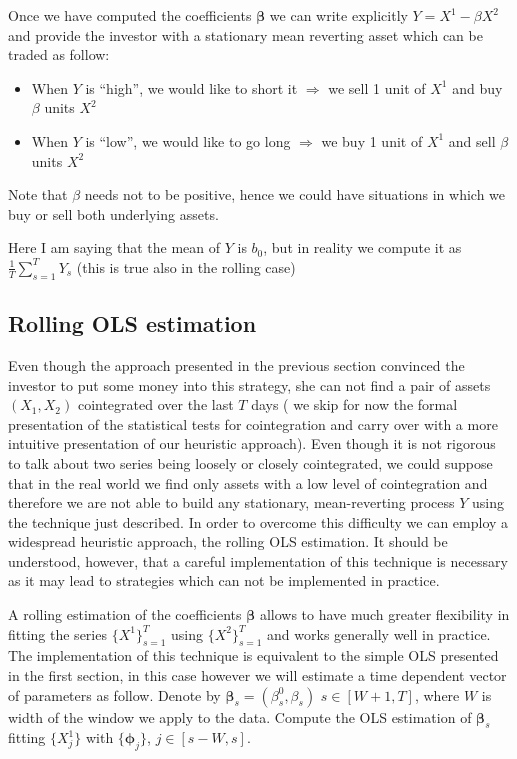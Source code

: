\documentclass[a4paper,11pt]{article}
\theoremstyle{remark}
\theoremstyle{plain}
\newcommand\ab[1]{{\color{blue} #1 }}
\begin{document}
Once we have computed the coefficients $\boldsymbol{\beta}$ we can write explicitly $Y=X^1-\beta X^2$ and provide the investor with a stationary mean reverting asset which can be traded as follow:
\begin{itemize}
\item When $Y$ is ``high'', we would like to short it $\Rightarrow$ we sell 1 unit of $X^1$ and buy $\beta$ units $X^2$
\item When $Y$ is ``low'', we would like to go long $\Rightarrow$ we buy 1 unit of $X^1$ and sell $\beta$ units $X^2$
\end{itemize}
Note that $\beta$ needs not to be positive, hence we could have situations in which we buy or sell both underlying assets.

\ab{Here I am saying that the mean of $Y$ is $b_0$, but in reality we compute it as $\frac{1}{T}\sum_{s=1}^T Y_s$ (this is true also in the rolling case) }

\subsection{Rolling OLS estimation}
Even though the approach presented in the previous section convinced the investor to put some money into this strategy, she can not find a pair of assets $(X_1,X_2)$ cointegrated over the last $T$ days ( we skip for now the formal presentation of the statistical tests for cointegration and carry over with a more intuitive presentation of our heuristic approach). Even though it is not rigorous to talk about two series being loosely or closely cointegrated, we could suppose that in the real world we find only assets with a low level of cointegration and therefore we are not able to build any stationary, mean-reverting process $Y$ using the technique just described. In order to overcome this difficulty we can employ a widespread heuristic approach, the rolling OLS estimation. It should be understood, however, that a careful implementation of this technique is necessary as it may lead to strategies which can not be implemented in practice.

A rolling estimation of the coefficients $\boldsymbol{\beta}$ allows to have much greater flexibility in fitting the series $\{X^1\}_{s=1}^{T}$ using $\{X^2\}_{s=1}^{T}$ and works generally well in practice. The implementation of this technique is equivalent to the simple OLS presented in the first section, in this case however we will estimate a time dependent vector of parameters as follow. Denote by $\boldsymbol{\beta}_s=(\beta^0_s, \beta_s)$ $s\in[W+1,T]$, where $W$ is width of the window we apply to the data. Compute the OLS estimation of $\boldsymbol{\beta}_s$ fitting $\{X^1_j\}$ with $\{\boldsymbol{\phi}_j\}$, $j\in[s-W,s]$.
\end{document}
